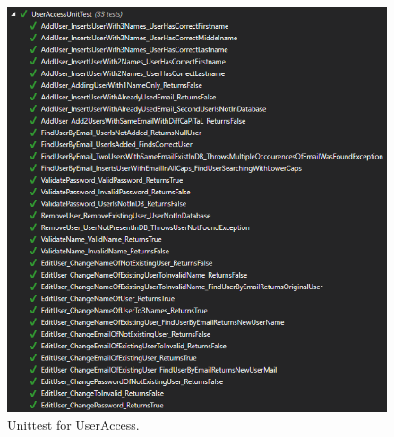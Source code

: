 \begin{figure}[h]
\centering
\includegraphics[width=0.7\linewidth]{figs/test/useraccessunittest_appendix.png}
\caption{Unittest for UserAccess.}
\label{fig:useraccessunittest_appendix}
\end{figure}
